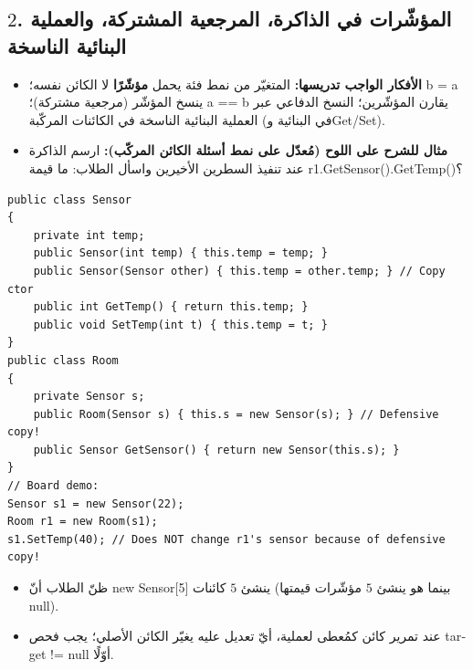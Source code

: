 \documentclass[14pt]{extarticle}
\begin{document}
\filbreak
\subsection*{$2$. المؤشّرات في الذاكرة، المرجعية المشتركة، والعملية البنائية الناسخة}
\begin{itemize}[itemsep=0.25em]
    \item \textbf{الأفكار الواجب تدريسها:} المتغيّر من نمط فئة يحمل \textbf{مؤشّرًا} لا الكائن نفسه؛ \textenglish{b = a} ينسخ المؤشّر (مرجعية مشتركة)؛ \textenglish{a == b} يقارن المؤشّرين؛ النسخ الدفاعي عبر العملية البنائية الناسخة في الكائنات المركّبة (في البنائية و\textenglish{Get}/\textenglish{Set}).
    \item \textbf{مثال للشرح على اللوح (مُعدّل على نمط أسئلة الكائن المركّب):} ارسم الذاكرة عند تنفيذ السطرين الأخيرين واسأل الطلاب: ما قيمة \textenglish{r1.GetSensor().GetTemp()}؟
\end{itemize}
\begin{boxCode}
\begin{english}
\begin{verbatim}
public class Sensor
{
    private int temp;
    public Sensor(int temp) { this.temp = temp; }
    public Sensor(Sensor other) { this.temp = other.temp; } // Copy ctor
    public int GetTemp() { return this.temp; }
    public void SetTemp(int t) { this.temp = t; }
}
public class Room
{
    private Sensor s;
    public Room(Sensor s) { this.s = new Sensor(s); } // Defensive copy!
    public Sensor GetSensor() { return new Sensor(this.s); }
}
// Board demo:
Sensor s1 = new Sensor(22);
Room r1 = new Room(s1);
s1.SetTemp(40); // Does NOT change r1's sensor because of defensive copy!
\end{verbatim}
\end{english}
\end{boxCode}
\begin{boxWarning}
\begin{itemize}
    \item ظنّ الطلاب أنّ \textenglish{new Sensor[5]} ينشئ $5$ كائنات (بينما هو ينشئ $5$ مؤشّرات قيمتها \textenglish{null}).
    \item عند تمرير كائن كمُعطى لعملية، أيّ تعديل عليه يغيّر الكائن الأصلي؛ يجب فحص \textenglish{target != null} أوّلًا.
\end{itemize}
\end{boxWarning}

\filbreak
\end{document}
